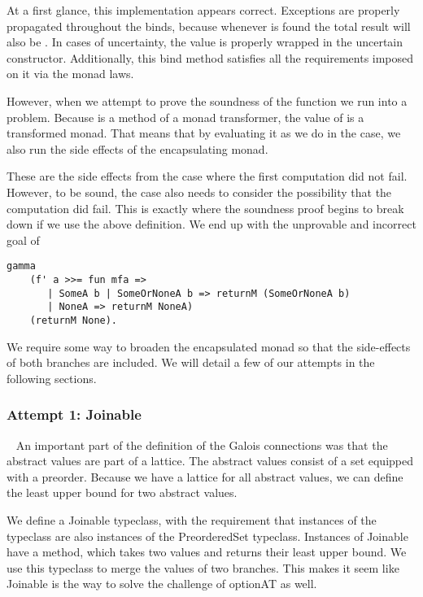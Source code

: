 At a first glance, this implementation appears correct. Exceptions are properly
propagated throughout the binds, because whenever  is found the total
result will also be . In cases of uncertainty, the value is properly
wrapped in the uncertain  constructor. Additionally, this bind
method satisfies all the requirements imposed on it via the monad laws.

However, when we attempt to prove the soundness of the function we run into a
problem. Because  is a method of a monad transformer, the
value of  is a transformed monad. That means that by evaluating it as
we do in the  case, we also run the side effects of the
encapsulating monad. 

These are the side effects from the case where the first computation did not 
fail. However, to be sound, the  case also needs to consider
the possibility that the computation did fail. This is exactly where the
soundness proof begins to break down if we use the above definition. We end up
with the unprovable and incorrect goal of 

\begin{verbatim}
gamma 
    (f' a >>= fun mfa => 
       | SomeA b | SomeOrNoneA b => returnM (SomeOrNoneA b) 
       | NoneA => returnM NoneA) 
    (returnM None).
\end{verbatim}

We require some way to broaden the encapsulated monad so that the side-effects of
both branches are included. We will detail a few of our attempts in the
following sections.

\subsubsection{Attempt 1: Joinable}~\label{sec:optionat_join}
An important part of the definition of the Galois connections was that the
abstract values are part of a lattice. The abstract values consist of a set
equipped with a preorder. Because we have a lattice for all abstract values, we
can define the least upper bound for two abstract values.

We define a Joinable typeclass, with the requirement that instances of the
typeclass are also instances of the PreorderedSet typeclass. Instances of
Joinable have a  method, which takes two values and returns their
least upper bound. We use this typeclass to merge the values of two branches.
This makes it seem like Joinable is the way to solve the challenge of optionAT
as well.

